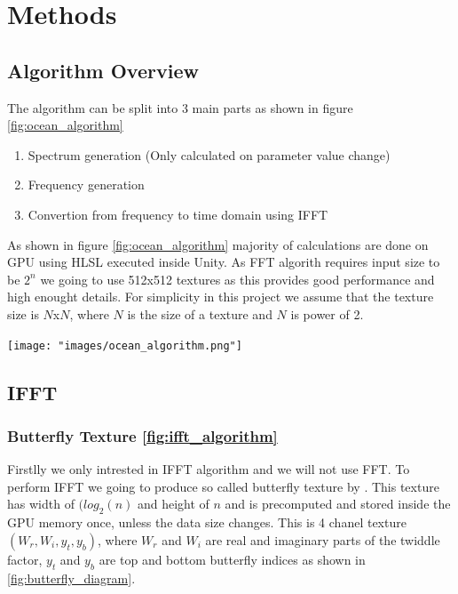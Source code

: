 \chapter{Methods}
\label{chapter2}



\section{Algorithm Overview}
The algorithm can be split into 3 main parts as shown in figure \ref{fig:ocean_algorithm}
\begin{enumerate}
    \item Spectrum generation (Only calculated on parameter value change)
    \item Frequency generation
    \item Convertion from frequency to time domain using IFFT
\end{enumerate}
As shown in figure \ref{fig:ocean_algorithm} majority of calculations are done on GPU using HLSL executed inside Unity. As FFT algorith requires input size to be $2^n$ we going to use 512x512 textures as this provides good performance and high enought details. For simplicity in this project we assume that the texture size is $N$x$N$, where $N$ is the size of a texture and $N$ is power of 2.

\begin{minipage}{1\textwidth}
    \centering
    \texttt{[image: "images/ocean\_algorithm.png"]}
    \label{fig:ocean_algorithm}
\end{minipage}
\section{IFFT}
\subsection{Butterfly Texture \ref{fig:ifft_algorithm}}
Firstlly we only intrested in IFFT algorithm and we will not use FFT.
To perform IFFT we going to produce so called butterfly texture by \cite[Fl{\"u}gge Fynn-Jorin]{flugge2017}.
This texture has width of $(log_2(n)$ and height of $n$ and is precomputed and stored inside the GPU memory once, unless the data size changes. This is 4 chanel texture $(W_r, W_i, y_t, y_b)$,
where $W_r$ and $W_i$ are real and imaginary parts of the twiddle factor, $y_t$ and $y_b$ are top and bottom butterfly indices as shown in \ref{fig:butterfly_diagram}.

